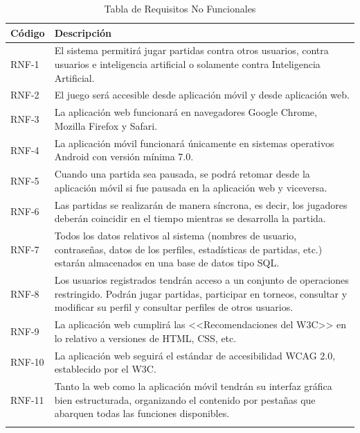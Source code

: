 \documentclass{article}
\begin{document}
\begin{center}
    \begin{longtable}{ | p{} | p{} | }
        \hline
        \textbf{Código} & \textbf{Descripción} \\
        \hline
        RNF-1 & El sistema permitirá jugar partidas contra otros usuarios, contra usuarios e inteligencia artificial o solamente contra Inteligencia Artificial. \\
        \hline
        RNF-2 & El juego será accesible desde aplicación móvil y desde aplicación web. \\
        \hline
        RNF-3 & La aplicación web funcionará en navegadores Google Chrome, Mozilla Firefox y Safari. \\
        \hline
        RNF-4 & La aplicación móvil funcionará únicamente en sistemas operativos Android con versión mínima 7.0. \\ %
        \hline
        RNF-5 & Cuando una partida sea pausada, se podrá retomar desde la aplicación móvil si fue pausada en la aplicación web y viceversa. \\
        \hline
        RNF-6 & Las partidas se realizarán de manera síncrona, es decir, los jugadores deberán coincidir en el tiempo mientras se desarrolla la partida. \\
        \hline
        RNF-7 & Todos los datos relativos al sistema (nombres de usuario, contraseñas, datos de los perfiles, estadísticas de partidas, etc.) estarán almacenados en una base de datos tipo SQL. \\
        \hline
        RNF-8 & Los usuarios registrados tendrán acceso a un conjunto de operaciones restringido. Podrán jugar partidas, participar en torneos, consultar y modificar su perfil y consultar perfiles de otros usuarios. \\
        \hline
        RNF-9 & La aplicación web cumplirá las <<Recomendaciones del W3C>> en lo relativo a versiones de HTML, CSS, etc. \\
        \hline
        RNF-10 & La aplicación web seguirá el estándar de accesibilidad WCAG 2.0, establecido por el W3C. \\
        \hline
        RNF-11 & Tanto la web como la aplicación móvil tendrán su interfaz gráfica bien estructurada, organizando el contenido por pestañas que abarquen todas las funciones disponibles. \\
        \hline
        
        \caption{Tabla de Requisitos No Funcionales}
    \end{longtable}
\end{center}
\end{document}
